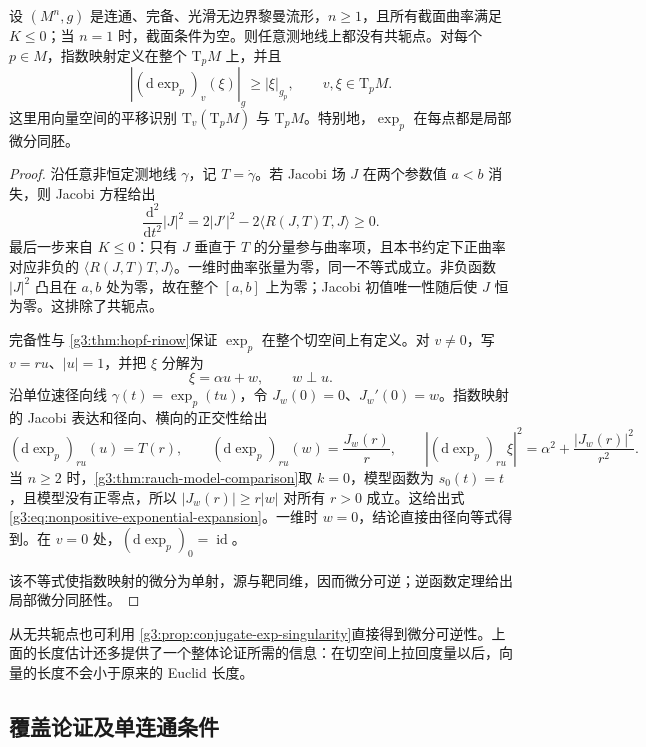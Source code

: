 \begin{proposition}\label{g3:prop:nonpositive-exponential-differential}
	设 \((M^n,g)\) 是连通、完备、光滑无边界黎曼流形，\(n\ge1\)，且所有截面曲率满足 \(K\le0\)；当 \(n=1\) 时，截面条件为空。则任意测地线上都没有共轭点。对每个 \(p\in M\)，指数映射定义在整个 \(\mathrm{T}_pM\) 上，并且
	\begin{equation}\label{g3:eq:nonpositive-exponential-expansion}
		|(\mathrm d\exp_p)_v(\xi)|_g\ge|\xi|_{g_p},
		\qquad v,\xi\in\mathrm{T}_pM.
	\end{equation}
	这里用向量空间的平移识别 \(\mathrm{T}_v(\mathrm{T}_pM)\) 与 \(\mathrm{T}_pM\)。特别地，\(\exp_p\) 在每点都是局部微分同胚。
\end{proposition}
\begin{proof}
	沿任意非恒定测地线 \(\gamma\)，记 \(T=\dot\gamma\)。若 Jacobi 场 \(J\) 在两个参数值 \(a<b\) 消失，则 Jacobi 方程给出
	\[
		\frac{\mathrm d^2}{\mathrm dt^2}|J|^2
		=2|J'|^2-2\langle R(J,T)T,J\rangle\ge0.
	\]
	最后一步来自 \(K\le0\)：只有 \(J\) 垂直于 \(T\) 的分量参与曲率项，且本书约定下正曲率对应非负的 \(\langle R(J,T)T,J\rangle\)。一维时曲率张量为零，同一不等式成立。非负函数 \(|J|^2\) 凸且在 \(a,b\) 处为零，故在整个 \([a,b]\) 上为零；Jacobi 初值唯一性随后使 \(J\) 恒为零。这排除了共轭点。

	完备性与 \cref{g3:thm:hopf-rinow}保证 \(\exp_p\) 在整个切空间上有定义。对 \(v\ne0\)，写 \(v=ru\)、\(|u|=1\)，并把 \(\xi\) 分解为
	\[
		\xi=\alpha u+w,\qquad w\perp u.
	\]
	沿单位速径向线 \(\gamma(t)=\exp_p(tu)\)，令 \(J_w(0)=0\)、\(J_w'(0)=w\)。指数映射的 Jacobi 表达和径向、横向的正交性给出
	\[
		(\mathrm d\exp_p)_{ru}(u)=T(r),\qquad
		(\mathrm d\exp_p)_{ru}(w)=\frac{J_w(r)}r,\qquad
		|(\mathrm d\exp_p)_{ru}\xi|^2
		=\alpha^2+\frac{|J_w(r)|^2}{r^2}.
	\]
	当 \(n\ge2\) 时，\cref{g3:thm:rauch-model-comparison}取 \(k=0\)，模型函数为 \(s_0(t)=t\)，且模型没有正零点，所以 \(|J_w(r)|\ge r|w|\) 对所有 \(r>0\) 成立。这给出式\eqref{g3:eq:nonpositive-exponential-expansion}。一维时 \(w=0\)，结论直接由径向等式得到。在 \(v=0\) 处，\((\mathrm d\exp_p)_0=\operatorname{id}\)。

	该不等式使指数映射的微分为单射，源与靶同维，因而微分可逆；逆函数定理给出局部微分同胚性。
\end{proof}

从无共轭点也可利用 \cref{g3:prop:conjugate-exp-singularity}直接得到微分可逆性。上面的长度估计还多提供了一个整体论证所需的信息：在切空间上拉回度量以后，向量的长度不会小于原来的 Euclid 长度。

\subsection{覆盖论证及单连通条件}
\label{g3:subsec:0901:02}

